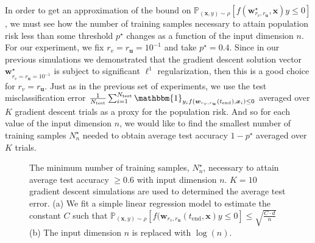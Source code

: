 \documentclass{article}
\begin{document}
In order to get an approximation of the bound on $\mathbb{P}_{(\boldsymbol{x}, y) \sim \rho}[f( \boldsymbol{w}_{r_v, r_{\boldsymbol{u}}}^{\star}, \boldsymbol{x})y \leq 0]$, we must see how the number of training samples necessary to attain population risk less than some threshold $p^{\star}$ changes as a function of the input dimension $n$. For our experiment, we fix $r_{v} = r_{\boldsymbol{u}} = 10^{-1}$ and take $p^{\star} = 0.4$. Since in our previous simulations we demonstrated that the gradient descent solution vector $\boldsymbol{w}_{r_v=r_{\boldsymbol{u}}=10^{-1}}^{\star}$ is subject to significant $\ell^1$ regularization, then this is a good choice for $r_{v} = r_{\boldsymbol{u}}$. Just as in the previous set of experiments, we use the test misclassification error $\frac{1}{N_{\text{test}}} \sum_{i=1}^{N_{\text{test}}} \mathbbm{1}_{y_i f(\boldsymbol{w}_{r_v, r_{\boldsymbol{u}}}(t_{\text{end}}), \boldsymbol{x}_i) \leq 0}$ averaged over $K$ gradient descent trials as a proxy for the population risk. And so for each value of the input dimension $n$, we would like to find the smallest number of training samples $N_n^{\star}$ needed to obtain average test accuracy $1-p^{\star}$ averaged over $K$ trials.

\begin{figure}[H]
\centering
{}\hfill
{}
\caption{The minimum number of training samples, $N_n^{\star}$, necessary to attain average test accuracy $\geq 0.6$ with input dimension $n$. $K=10$ gradient descent simulations are used to determined the average test error. (a) We fit a simple linear regression model to estimate the constant $C$ such that $\mathbb{P}_{(\boldsymbol{x}, y) \sim \rho}[f(\boldsymbol{w}_{r_v, r_{\boldsymbol{u}}}(t_{\text{end}}, \boldsymbol{x})y \leq 0] \leq \sqrt{\frac{C \cdot d}{n}}$ (b) The input dimension $n$ is replaced with $\log(n)$.}\label{fig:numsamples}
\end{figure}
\end{document}
